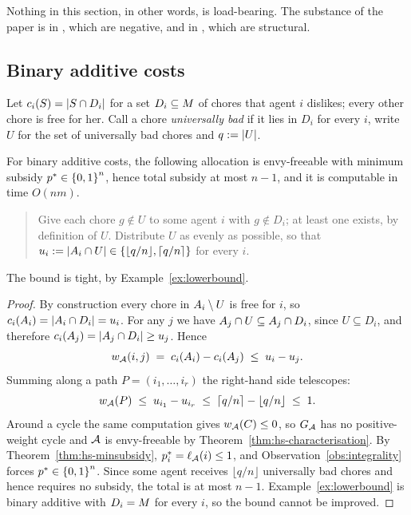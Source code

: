 \noindent
Nothing in this section, in other words, is load-bearing. The substance of the
paper is in ,
which are negative, and in , which are
structural.

\subsection{Binary additive costs}
\label{sec:binadd}

Let $c_i(S) = \left\lvert S \cap D_i\right\rvert$ for a set $D_i \subseteq M$ of chores
that agent $i$ dislikes; every other chore is free for her. Call a chore
\emph{universally bad} if it lies in $D_i$ for every $i$, write $U$ for the set
of universally bad chores and $q := \left\lvert U\right\rvert$.

\begin{theorem}
\label{thm:binadd}
For binary additive costs, the following allocation is envy-freeable with
minimum subsidy $p^{*} \in \left\{0,1\right\}^n$, hence total subsidy at most
$n-1$, and it is computable in time $O(nm)$.
\begin{quote}
Give each chore $g \notin U$ to some agent $i$ with $g \notin D_i$; at least one
exists, by definition of $U$. Distribute $U$ as evenly as possible, so that
$u_i := \left\lvert A_{i} \cap U\right\rvert \in \left\{\lfloor q/n \rfloor, \lceil q/n \rceil\right\}$
for every $i$.
\end{quote}
The bound is tight, by Example~\ref{ex:lowerbound}.
\end{theorem}

\begin{proof}
By construction every chore in $A_{i} \setminus U$ is free for $i$, so
$c_i(A_{i}) = \left\lvert A_{i} \cap D_i\right\rvert = u_i$. For any $j$ we have
$A_{j} \cap U \subseteq A_{j} \cap D_i$, since $U \subseteq D_i$, and
therefore $c_i(A_{j}) = \left\lvert A_{j} \cap D_i\right\rvert \ge u_j$. Hence
\[
  w_{\mathcal{A}}(i,j) \;=\; c_i(A_{i}) - c_i(A_{j})
  \;\le\; u_i - u_j .
\]
Summing along a path $P = (i_1, \dots, i_r)$ the right-hand side telescopes:
\[
  w_{\mathcal{A}}(P) \;\le\; u_{i_1} - u_{i_r}
  \;\le\; \lceil q/n \rceil - \lfloor q/n \rfloor \;\le\; 1 .
\]
Around a cycle the same computation gives $w_{\mathcal{A}}(C) \le 0$, so
$G_{\mathcal{A}}$ has no positive-weight cycle and $\mathcal{A}$ is envy-freeable
by Theorem~\ref{thm:hs-characterisation}. By Theorem~\ref{thm:hs-minsubsidy},
$p^{*}_i = \ell_{\mathcal{A}}(i) \le 1$, and
Observation~\ref{obs:integrality} forces $p^{*} \in \left\{0,1\right\}^n$. Since
some agent receives $\lfloor q/n \rfloor$ universally bad chores and hence
requires no subsidy, the total is at most $n-1$. Example~\ref{ex:lowerbound} is
binary additive with $D_i = M$ for every $i$, so the bound cannot be
improved.
\end{proof}

